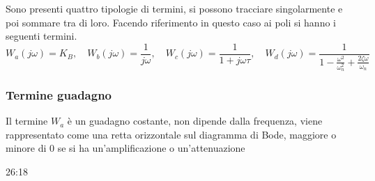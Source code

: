 Sono presenti quattro tipologie di termini, si possono tracciare singolarmente
e poi sommare tra di loro.
Facendo riferimento in questo caso ai poli si hanno i seguenti termini.
$$
W_a(j\omega) = K_B,\quad W_b(j\omega)=\frac{1}{j\omega},\quad W_c(j\omega)=
\frac{1}{1+j\omega\tau},\quad
W_d(j\omega)=\frac{1}{1-\frac{\omega^2}{\omega_n^2}+\frac{2\zeta\omega}{\omega_n
} }
$$

\subsubsection{Termine guadagno}
Il termine $W_a$ è un guadagno costante, non dipende dalla frequenza, viene
rappresentato come una retta orizzontale sul diagramma di Bode, maggiore o
minore di 0 se si ha un'amplificazione o un'attenuazione
\begin{figure}[h]
\centering
{}
\end{figure}

\begin{figure}[h]
\centering
{}
\end{figure}
26:18
